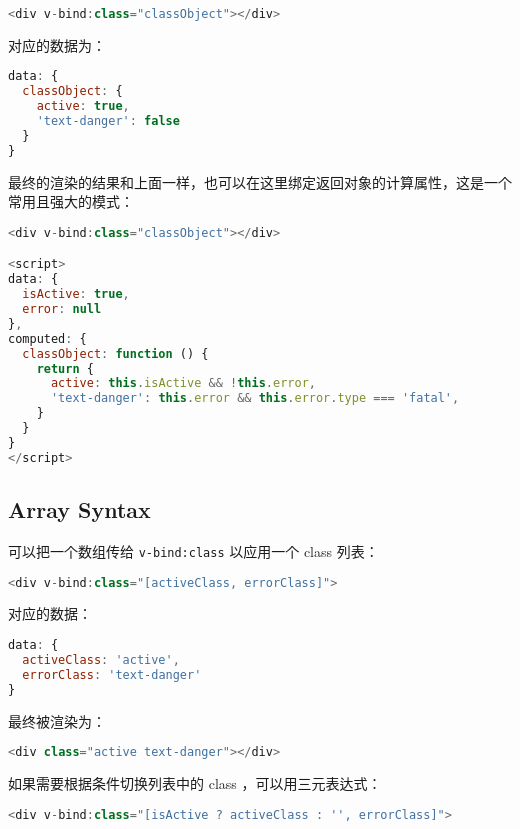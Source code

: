 \begin{lstlisting}[language=JavaScript]
<div v-bind:class="classObject"></div>
\end{lstlisting}

对应的数据为：

\begin{lstlisting}[language=JavaScript]
data: {
  classObject: {
    active: true,
    'text-danger': false
  }
}
\end{lstlisting}

最终的渲染的结果和上面一样，也可以在这里绑定返回对象的计算属性，这是一个常用且强大的模式：

\begin{lstlisting}[language=JavaScript]
<div v-bind:class="classObject"></div>

<script>
data: {
  isActive: true,
  error: null
},
computed: {
  classObject: function () {
    return {
      active: this.isActive && !this.error,
      'text-danger': this.error && this.error.type === 'fatal',
    }
  }
}
</script>
\end{lstlisting}


\subsection{Array Syntax}

可以把一个数组传给 \texttt{v-bind:class} 以应用一个 class 列表：


\begin{lstlisting}[language=JavaScript]
<div v-bind:class="[activeClass, errorClass]">
\end{lstlisting}

对应的数据：

\begin{lstlisting}[language=JavaScript]
data: {
  activeClass: 'active',
  errorClass: 'text-danger'
}
\end{lstlisting}

最终被渲染为：

\begin{lstlisting}[language=JavaScript]
<div class="active text-danger"></div>
\end{lstlisting}

如果需要根据条件切换列表中的 class ，可以用三元表达式：


\begin{lstlisting}[language=JavaScript]
<div v-bind:class="[isActive ? activeClass : '', errorClass]">
\end{lstlisting}

